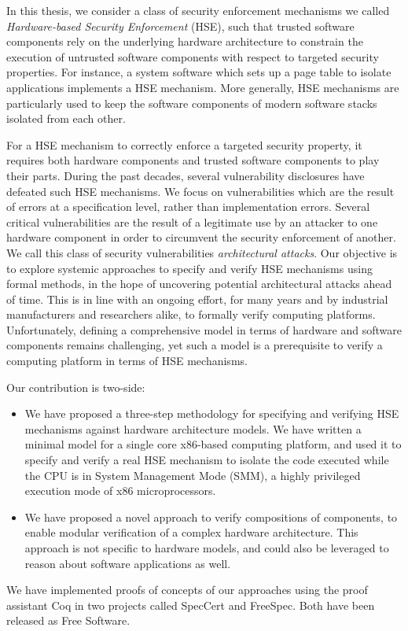 In this thesis, we consider a class of security enforcement mechanisms we called
\emph{Hardware-based Security Enforcement} (HSE), such that trusted software
components rely on the underlying hardware architecture to constrain the
execution of untrusted software components with respect to targeted security
properties.
%
For instance, a system software which sets up a page table to isolate
applications implements a HSE mechanism.
%
More generally, HSE mechanisms are particularly used to keep the software
components of modern software stacks isolated from each other.

For a HSE mechanism to correctly enforce a targeted security property, it
requires both hardware components and trusted software components to play their
parts.
%
During the past decades, several vulnerability disclosures have defeated such
HSE mechanisms.
%
We focus on vulnerabilities which are the result of errors at a specification
level, rather than implementation errors.
%
Several critical vulnerabilities are the result of a legitimate use by an
attacker to one hardware component in order to circumvent the security
enforcement of another.
%
We call this class of security vulnerabilities \emph{architectural attacks}.
%
Our objective is to explore systemic approaches to specify and verify HSE
mechanisms using formal methods, in the hope of uncovering potential
architectural attacks ahead of time.
%
This is in line with an ongoing effort, for many years and by industrial
manufacturers and researchers alike, to formally verify computing platforms.
%
Unfortunately, defining a comprehensive model in terms of hardware and software
components remains challenging, yet such a model is a prerequisite to verify a
computing platform in terms of HSE mechanisms.

Our contribution is two-side:
%
\begin{itemize}
\item We have proposed a three-step methodology for specifying and verifying HSE
  mechanisms against hardware architecture models.
  We have written a minimal model for a single core x86-based computing
  platform, and used it to specify and verify a real HSE mechanism to
  isolate the code executed while the CPU is in System Management Mode (SMM), a
  highly privileged execution mode of x86 microprocessors.
\item We have proposed a novel approach to verify compositions of
  components, to enable modular verification of a complex hardware architecture.
  This approach is not specific to hardware models, and could also be leveraged
  to reason about software applications as well.
\end{itemize}
%
We have implemented proofs of concepts of our approaches using the proof
assistant Coq in two projects called SpecCert and FreeSpec. Both have been
released as Free Software.
